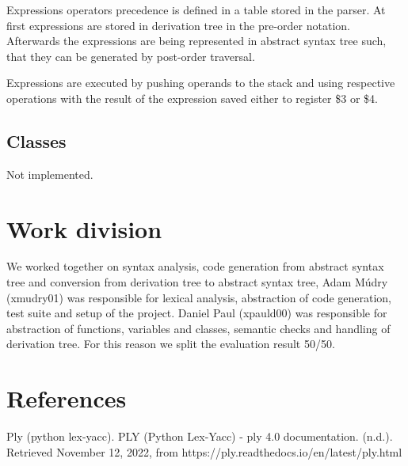 \documentclass[12pt]{article}
\begin{document}
Expressions operators precedence is defined in a table stored in the parser. 
At first expressions are stored in derivation tree in the pre-order notation. Afterwards the expressions are being represented in abstract syntax tree such, that they can be generated by post-order traversal. 

Expressions are executed by pushing operands to the stack and using respective operations with the result of the expression saved either to register \$3 or \$4.

\subsection{Classes}

Not implemented.

\newpage
\section{Work division}
We worked together on syntax analysis, code generation from abstract syntax tree and conversion from derivation tree to abstract syntax tree,
Adam Múdry (xmudry01) was responsible for lexical analysis, abstraction of code generation, test suite and setup of the project.
Daniel Paul (xpauld00) was responsible for abstraction of functions, variables and classes, semantic checks and handling of derivation tree.
For this reason we split the evaluation result 50/50.

\section{References}
Ply (python lex-yacc). PLY (Python Lex-Yacc) - ply 4.0 documentation. (n.d.). Retrieved November 12, 2022, from https://ply.readthedocs.io/en/latest/ply.html 
\end{document}
